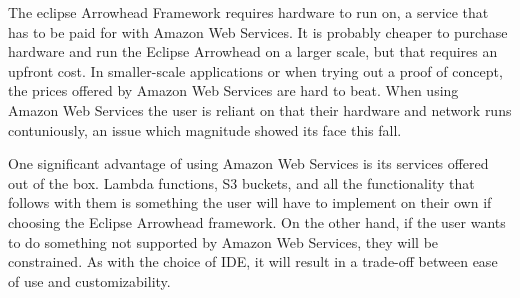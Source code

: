 The eclipse Arrowhead Framework requires hardware to run on, a service that has to be paid for with Amazon Web Services. 
It is probably cheaper to purchase hardware and run the Eclipse Arrowhead on a larger scale, but that requires an upfront cost.
In smaller-scale applications or when trying out a proof of concept, the prices offered by Amazon Web Services are hard to beat.
When using Amazon Web Services the user is reliant on that their hardware and network runs contuniously, an issue which magnitude showed its face this fall. 


One significant advantage of using Amazon Web Services is its services offered out of the box.
Lambda functions, S3 buckets, and all the functionality that follows with them is something the user will have to implement on their own if choosing the Eclipse Arrowhead framework.
On the other hand, if the user wants to do something not supported by Amazon Web Services, they will be constrained.
As with the choice of IDE, it will result in a trade-off between ease of use and customizability.
